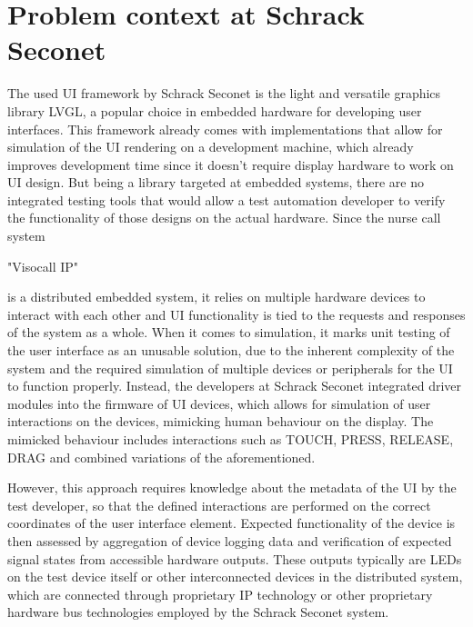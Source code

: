 \documentclass[Proposal,BIC,english,IEEE]{BASE/twbook} %
\begin{document}
\section{Problem context at Schrack Seconet}
The used UI framework by Schrack Seconet is the light and versatile graphics library LVGL, a popular choice in embedded hardware for developing user interfaces. This framework already comes with implementations that allow for simulation of the UI rendering on a development machine, which already improves development time since it doesn't require display hardware to work on UI design.
But being a library targeted at embedded systems, there are no integrated testing tools that would allow a test automation developer to verify the functionality of those designs on the actual hardware. Since the nurse call system \begin{em}"Visocall IP"\end{em} is a distributed embedded system, it relies on multiple hardware devices to interact with each other and UI functionality is tied to the requests and responses of the system as a whole.
When it comes to simulation, it marks unit testing of the user interface as an unusable solution, due to the inherent complexity of the system and the required simulation of multiple devices or peripherals for the UI to function properly.
Instead, the developers at Schrack Seconet integrated driver modules into the firmware of UI devices, which allows for simulation of user interactions on the devices, mimicking human behaviour on the display. The mimicked behaviour includes interactions such as TOUCH, PRESS, RELEASE, DRAG and combined variations of the aforementioned.

However, this approach requires knowledge about the metadata of the UI by the test developer, so that the defined interactions are performed on the correct coordinates of the user interface element. Expected functionality of the device is then assessed by aggregation of device logging data and verification of expected signal states from accessible hardware outputs. These outputs typically are LEDs on the test device itself or other interconnected devices in the distributed system, which are connected through proprietary IP technology or other proprietary hardware bus technologies employed by the Schrack Seconet system.
\end{document}
